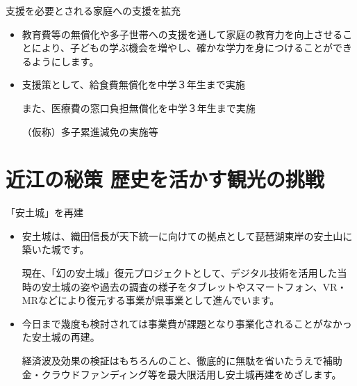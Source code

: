 \documentclass[dvipdfmx]{beamer}
\begin{document}
    \begin{frame}{支援を必要とされる家庭への支援を拡充}{}
        \begin{small}
            \begin{itemize}
                \setlength{\parsep}{.5mm}
                \setlength{\itemsep}{2mm}
                \item 教育費等の無償化や多子世帯への支援を通して家庭の教育力を向上させることにより、子どもの学ぶ機会を増やし、確かな学力を身につけることができるようにします。
                \item 支援策として、給食費無償化を中学３年生まで実施\par
                また、医療費の窓口負担無償化を中学３年生まで実施\par
                （仮称）多子累進減免の実施等
            \end{itemize}
        \end{small}
    \end{frame}

\section{近江の秘策 歴史を活かす観光の挑戦}
    \begin{frame}{}{}
        \sectionpage
    \end{frame}

    \begin{frame}{「安土城」を再建}{}
        \begin{small}
            \begin{itemize}
                \setlength{\parsep}{.5mm}
                \setlength{\itemsep}{2mm}
                \item 安土城は、織田信長が天下統一に向けての拠点として琵琶湖東岸の安土山に築いた城です。\par
                現在、「幻の安土城」復元プロジェクトとして、デジタル技術を活用した当時の安土城の姿や過去の調査の様子をタブレットやスマートフォン、VR・MRなどにより復元する事業が県事業として進んでいます。
                \item 今日まで幾度も検討されては事業費が課題となり事業化されることがなかった安土城の再建。\par
                経済波及効果の検証はもちろんのこと、徹底的に無駄を省いたうえで補助金・クラウドファンディング等を最大限活用し安土城再建をめざします。
            \end{itemize}
        \end{small}
    \end{frame}
\end{document}
